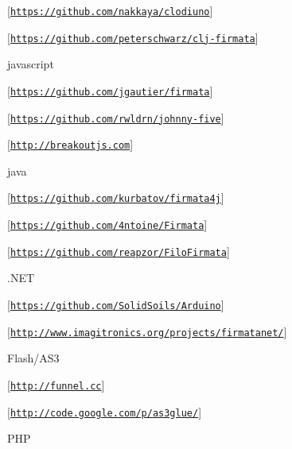 \begin{DoxyItemize}
\begin{DoxyItemize}
\item \mbox{[}\href{https://github.com/nakkaya/clodiuno}{\tt https\+://github.\+com/nakkaya/clodiuno}\mbox{]}
\item \mbox{[}\href{https://github.com/peterschwarz/clj-firmata}{\tt https\+://github.\+com/peterschwarz/clj-\/firmata}\mbox{]}
\end{DoxyItemize}
\item javascript
\begin{DoxyItemize}
\item \mbox{[}\href{https://github.com/jgautier/firmata}{\tt https\+://github.\+com/jgautier/firmata}\mbox{]}
\item \mbox{[}\href{https://github.com/rwldrn/johnny-five}{\tt https\+://github.\+com/rwldrn/johnny-\/five}\mbox{]}
\item \mbox{[}\href{http://breakoutjs.com}{\tt http\+://breakoutjs.\+com}\mbox{]}
\end{DoxyItemize}
\item java
\begin{DoxyItemize}
\item \mbox{[}\href{https://github.com/kurbatov/firmata4j}{\tt https\+://github.\+com/kurbatov/firmata4j}\mbox{]}
\item \mbox{[}\href{https://github.com/4ntoine/Firmata}{\tt https\+://github.\+com/4ntoine/\+Firmata}\mbox{]}
\item \mbox{[}\href{https://github.com/reapzor/FiloFirmata}{\tt https\+://github.\+com/reapzor/\+Filo\+Firmata}\mbox{]}
\end{DoxyItemize}
\item .N\+ET
\begin{DoxyItemize}
\item \mbox{[}\href{https://github.com/SolidSoils/Arduino}{\tt https\+://github.\+com/\+Solid\+Soils/\+Arduino}\mbox{]}
\item \mbox{[}\href{http://www.imagitronics.org/projects/firmatanet/}{\tt http\+://www.\+imagitronics.\+org/projects/firmatanet/}\mbox{]}
\end{DoxyItemize}
\item Flash/\+A\+S3
\begin{DoxyItemize}
\item \mbox{[}\href{http://funnel.cc}{\tt http\+://funnel.\+cc}\mbox{]}
\item \mbox{[}\href{http://code.google.com/p/as3glue/}{\tt http\+://code.\+google.\+com/p/as3glue/}\mbox{]}
\end{DoxyItemize}
\item P\+HP

\end{DoxyItemize}
